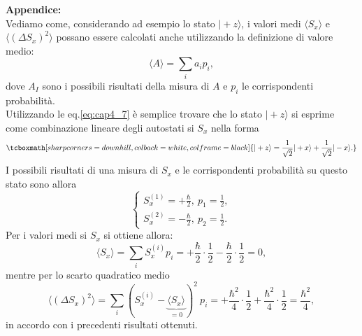 \textbf{Appendice:}\\
Vediamo come, considerando ad esempio lo stato $\vert + z \rangle $, i valori medi $\langle S_x \rangle $ e $\langle (\Delta S_x)^2 \rangle $ possano essere calcolati anche utilizzando la definizione di valore medio:
	\begin{equation}
		\langle A \rangle = \sum _i a_i p_i,
	\end{equation}
dove $A_I$ sono i possibili risultati della misura di $A$ e $p_i$ le corrispondenti probabilità.\\
Utilizzando le eq.\eqref{eq:cap4_7} è semplice trovare che lo stato $\vert +z \rangle$ si esprime come combinazione lineare degli autostati si $S_x$ nella forma
	\begin{equation}
		\tcboxmath[sharp corners=downhill, colback=white, colframe=black]{
			\vert +z \rangle = \frac{1}{\sqrt{2}} \vert +x \rangle + \frac{1}{\sqrt{2}} \vert -x \rangle .
			}
	\end{equation}
I possibili risultati di una misura di $S_x$ e le corrispondenti probabilità su questo stato sono allora
	\begin{equation}
		\begin{cases}
		\displaystyle{S_x ^{(1)} = +\frac{\hbar}{2}, \ p_1 = \frac{1}{2}}, \\[.5cm]
		\displaystyle{S_x ^{(2)} = -\frac{\hbar}{2}, \ p_2 = \frac{1}{2}}.
		\end{cases}
	\end{equation}
Per i valori medi si $S_x$ si ottiene allora:
	\begin{equation}
		\langle S_x \rangle = \sum _i S_x ^{(i)} p_i= +\frac{\hbar}{2}\cdot\frac{1}{2}-\frac{\hbar}{2}\cdot\frac{1}{2}=0,
	\end{equation}
mentre per lo scarto quadratico medio
	\begin{equation}
		\langle (\Delta S_x)^2 \rangle = \sum _i ( S_x ^{(i)}- \underbrace{\langle S_x \rangle}_{=0}) ^2\ p_i= +\frac{\hbar ^2}{4}\cdot\frac{1}{2}+\frac{\hbar ^2}{4}\cdot\frac{1}{2}= \frac{\hbar ^2}{4},
	\end{equation}
in accordo con i precedenti risultati ottenuti.
